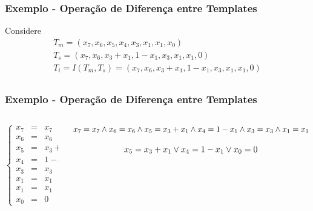 \documentclass[aspectratio=43,hyperref={pdfpagelabels=false}]{beamer}
\begin{document}
 \begin{frame}
    \frametitle{Exemplo - Operação de Diferença entre Templates}
    Considere
    \begin{equation}
    \begin{split}
    T_m = (x_7, x_6, x_5, x_4, x_3, x_1, x_1, x_0) \\
    T_s = (x_7, x_6, x_3 + x_1, 1 - x_1, x_3, x_1, x_1, 0)\\
    T_i = I(T_m,T_s) = (x_7, x_6, x_3 + x_1, 1 - x_1, x_3, x_1, x_1, 0)\\
    \end{split}
    \end{equation}
 \end{frame}

 \begin{frame}
    \frametitle{Exemplo - Operação de Diferença entre Templates}
    \begin{columns}
        \begin{column}{5cm}
    \begin{equation}
    \left\{\begin{matrix}
    x_7 & = & x_7 \\ 
    x_6 & = & x_6 \\ 
    x_5 & = & x_3 + x_1 \\ 
    x_4 & = & 1 - x_1 \\ 
    x_3 & = & x_3 \\ 
    x_1 & = & x_1 \\ 
    x_1 & = & x_1 \\ 
    x_0 & = & 0
    \end{matrix}\right.
    \end{equation}

    \end{column}

    \begin{column}{5cm}
    \begin{equation}\\
    x_7 = x_7 \wedge  
    x_6 = x_6 \wedge  \\
    x_5 = x_3 + x_1 \wedge  
    x_4 =   1 - x_1 \wedge  \\
    x_3 = x_3 \wedge  
    x_1 = x_1 \wedge  \\
    x_1 = x_1 \wedge  
    x_0 = 0
    \end{equation}

    \begin{equation}\\
    x_5 = x_3 + x_1 \\
    \vee x_4 = 1 - x_1 \\
    \vee x_0 = 0
    \label{eq:logicalComplement1}
    \end{equation}
    \end{column}
\end{columns}
\end{frame}
\end{document}
